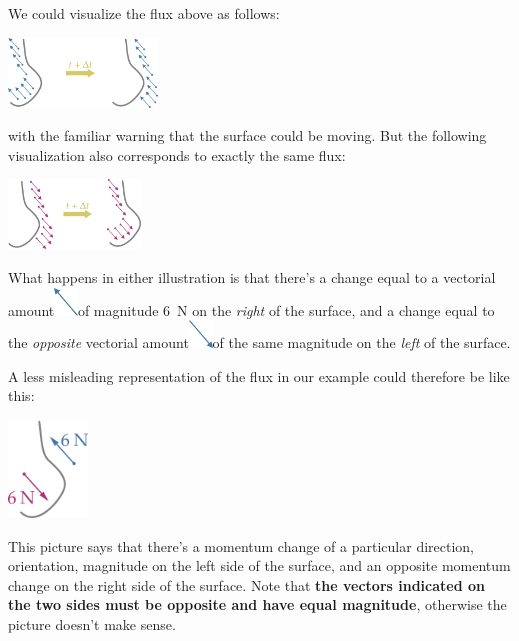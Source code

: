 We could visualize the flux above as follows:
\begin{center}
  \includegraphics[height=5em]{images/flux_vector_shift.pdf}
\end{center}
with the familiar warning that the surface could be moving. But the following visualization also corresponds to exactly the same flux:
\begin{center}
  \includegraphics[height=5em]{images/flux_vector_shift_neg.pdf}
\end{center}
What happens in either illustration is that there's a change equal to a vectorial amount\enspace\includegraphics[align=c,height=2em]{images/vec_NW.pdf}\enspace of magnitude \qty{6}{N} on the \emph{right} of the surface, and a change equal to the \emph{opposite} vectorial amount\enspace\includegraphics[align=c,height=2em]{images/vec_SE.pdf}\enspace of the same magnitude on the \emph{left} of the surface.

{A less misleading representation of the flux in our example could therefore be like this:\noprelistbreak%
  \begin{center}
    \includegraphics[height=7em]{images/flux_vec_both.pdf}
  \end{center}
}
\noindent This picture says that there's a momentum change of a particular direction, orientation, magnitude on the left side of the surface, and an opposite momentum change on the right side of the surface. Note that \textbf{the vectors indicated on the two sides must be opposite and have equal magnitude}, otherwise the picture doesn't make sense.

